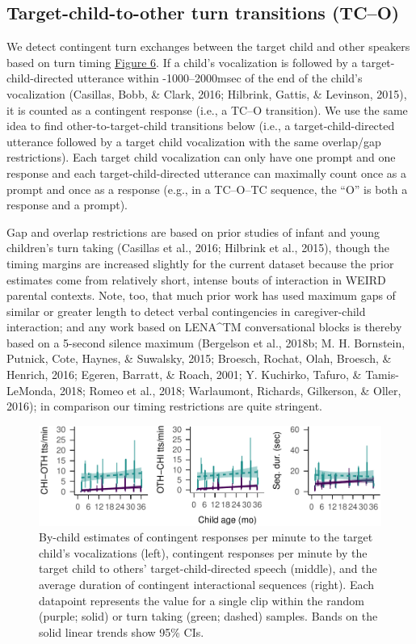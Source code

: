 \documentclass[floatsintext,man]{apa6}
\theoremstyle{definition}
\theoremstyle{definition}
\theoremstyle{definition}
\theoremstyle{remark}
\begin{document}
\subsection{Target-child-to-other turn transitions
(TC--O)}\label{target-child-to-other-turn-transitions-tco}

We detect contingent turn exchanges between the target child and other
speakers based on turn timing \protect\hyperlink{fig6}{Figure 6}. If a
child's vocalization is followed by a target-child-directed utterance
within -1000--2000msec of the end of the child's vocalization (Casillas,
Bobb, \& Clark, 2016; Hilbrink, Gattis, \& Levinson, 2015), it is
counted as a contingent response (i.e., a TC--O transition). We use the
same idea to find other-to-target-child transitions below (i.e., a
target-child-directed utterance followed by a target child vocalization
with the same overlap/gap restrictions). Each target child vocalization
can only have one prompt and one response and each target-child-directed
utterance can maximally count once as a prompt and once as a response
(e.g., in a TC--O--TC sequence, the \enquote{O} is both a response and a
prompt).

Gap and overlap restrictions are based on prior studies of infant and
young children's turn taking (Casillas et al., 2016; Hilbrink et al.,
2015), though the timing margins are increased slightly for the current
dataset because the prior estimates come from relatively short, intense
bouts of interaction in WEIRD parental contexts. Note, too, that much
prior work has used maximum gaps of similar or greater length to detect
verbal contingencies in caregiver-child interaction; and any work based
on LENA\^{}TM conversational blocks is thereby based on a 5-second
silence maximum (Bergelson et al., 2018b; M. H. Bornstein, Putnick,
Cote, Haynes, \& Suwalsky, 2015; Broesch, Rochat, Olah, Broesch, \&
Henrich, 2016; Egeren, Barratt, \& Roach, 2001; Y. Kuchirko, Tafuro, \&
Tamis-LeMonda, 2018; Romeo et al., 2018; Warlaumont, Richards,
Gilkerson, \& Oller, 2016); in comparison our timing restrictions are
quite stringent.

\begin{figure}
\centering
\includegraphics{Tseltal-CLE_files/figure-latex/fig7-1.pdf}
\caption{\label{fig:fig7}By-child estimates of contingent responses per
minute to the target child's vocalizations (left), contingent responses
per minute by the target child to others' target-child-directed speech
(middle), and the average duration of contingent interactional sequences
(right). Each datapoint represents the value for a single clip within
the random (purple; solid) or turn taking (green; dashed) samples. Bands
on the solid linear trends show 95\% CIs.}
\end{figure}
\end{document}
